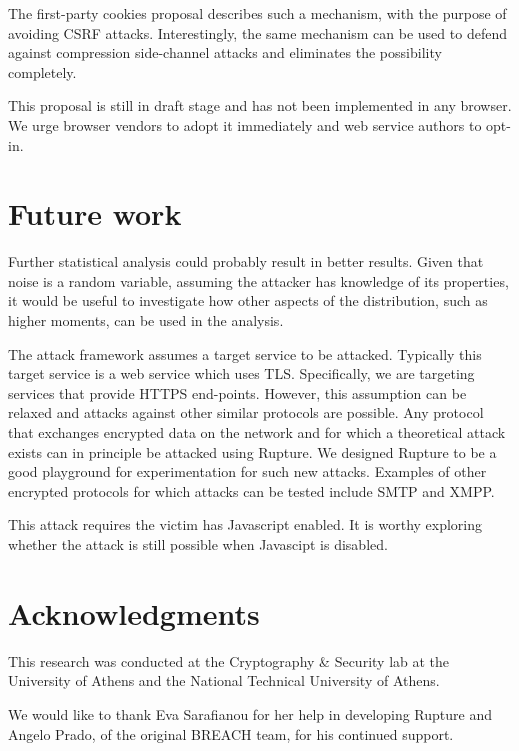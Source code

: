 \documentclass[a4paper, 11 pt, conference]{article}  %
\begin{document}
The first-party cookies proposal \cite{c14} describes such a mechanism, with the
purpose of avoiding CSRF attacks. Interestingly, the same mechanism can be used
to defend against compression side-channel attacks and eliminates the
possibility completely.

This proposal is still in draft stage and has not been implemented in any
browser. We urge browser vendors to adopt it immediately and web service authors
to opt-in.


\section{Future work}

Further statistical analysis could probably result in better results. Given that
noise is a random variable, assuming the attacker has knowledge of its
properties, it would be useful to investigate how other aspects of the
distribution, such as higher moments, can be used in the analysis.

The attack framework assumes a target service to be attacked. Typically this
target service is a web service which uses TLS. Specifically, we are targeting
services that provide HTTPS end-points. However, this assumption can be relaxed
and attacks against other similar protocols are possible. Any protocol that
exchanges encrypted data on the network and for which a theoretical attack
exists can in principle be attacked using Rupture. We designed Rupture to be a
good playground for experimentation for such new attacks. Examples of other
encrypted protocols for which attacks can be tested include SMTP and XMPP.

This attack requires the victim has Javascript enabled. It is worthy exploring
whether the attack is still possible when Javascipt is disabled.


\section{Acknowledgments}

This research was conducted at the Cryptography \& Security lab at the University of Athens
and the National Technical University of Athens.

We would like to thank Eva Sarafianou for her help in developing Rupture and
Angelo Prado, of the original BREACH team, for his continued support.
\end{document}

